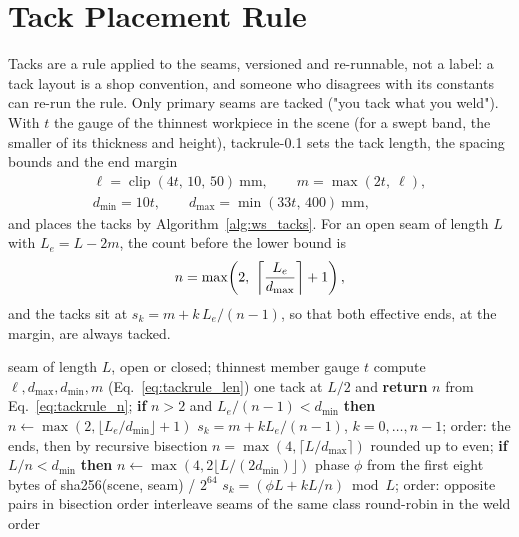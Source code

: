 \section{Tack Placement Rule}
\label{sec:ws_tacks}
Tacks are a rule applied to the seams, versioned and re-runnable, not a label: a tack layout
is a shop convention, and someone who disagrees with its constants can re-run the rule. Only
primary seams are tacked ("you tack what you weld"). With $t$ the gauge of the thinnest
workpiece in the scene (for a swept band, the smaller of its thickness and height),
tackrule-0.1 sets the tack
length, the spacing bounds and the end margin
\begin{equation}
\begin{gathered}
\ell = \operatorname{clip}(4t,\,10,\,50)\ \mathrm{mm},\qquad m = \max(2t,\ \ell),\\
d_{\min} = 10t,\qquad d_{\max} = \min(33t,\,400)\ \mathrm{mm},
\end{gathered}
\label{eq:tackrule_len}
\end{equation}
and places the tacks by Algorithm~\ref{alg:ws_tacks}. For an open seam of length $L$ with
$L_e=L-2m$, the count before the lower bound is
\begin{equation}
n = \max\!\left(2,\ \ceil*{\frac{L_e}{d_{\max}}}+1\right),
\label{eq:tackrule_n}
\end{equation}
and the tacks sit at $s_k=m+k\,L_e/(n-1)$, so that both effective ends, at the margin, are always
tacked.

\begin{algorithm}[htbp]
\caption{tackrule-0.1 on one primary seam}
\label{alg:ws_tacks}
\begin{algorithmic}[1]
\REQUIRE seam of length $L$, open or closed; thinnest member gauge $t$
\STATE compute $\ell, d_{\max}, d_{\min}, m$ (Eq.~\ref{eq:tackrule_len})
    \STATE one tack at $L/2$ and \textbf{return}
  \ENDIF
  \STATE $n$ from Eq.~\ref{eq:tackrule_n}; \textbf{if} $n>2$ and $L_e/(n-1)<d_{\min}$ \textbf{then} $n\gets\max(2,\lfloor L_e/d_{\min}\rfloor+1)$
  \STATE $s_k=m+kL_e/(n-1)$, $k=0,\dots,n-1$; order: the ends, then by recursive bisection
\ELSE
  \STATE $n=\max(4,\lceil L/d_{\max}\rceil)$ rounded up to even; \textbf{if} $L/n<d_{\min}$ \textbf{then} $n\gets\max(4,2\lfloor L/(2d_{\min})\rfloor)$
  \STATE phase $\phi$ from the first eight bytes of sha256(scene, seam) / $2^{64}$
  \STATE $s_k=(\phi L+kL/n)\bmod L$; order: opposite pairs in bisection order
\ENDIF
\STATE interleave seams of the same class round-robin in the weld order
\end{algorithmic}
\end{algorithm}

